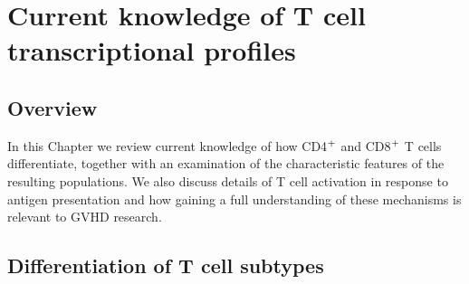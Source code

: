 
\chapter{Current knowledge of T cell transcriptional profiles} %

\label{Chapter2} %


\section{Overview}

In this Chapter we review current knowledge of how CD4$\textsuperscript{+}$ and CD8$\textsuperscript{+}$ T cells differentiate, together with an examination of the characteristic features of the resulting populations. We also discuss details of T cell activation in response to antigen presentation and how gaining a full understanding of these mechanisms is relevant to GVHD research. 

\section{Differentiation of T cell subtypes}

